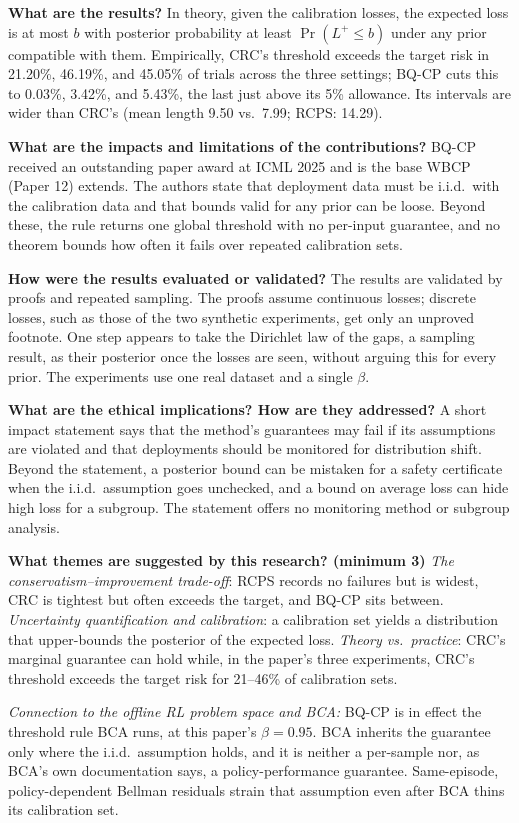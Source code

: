 \documentclass[11pt]{article}
\newcommand{\q}[2]{\item \textbf{#1} #2}
\newcommand{\tiein}[1]{\par\smallskip\noindent\emph{Connection to the offline RL problem space and BCA:} #1\par\medskip}
\begin{document}
\begin{qna}
\q{What are the results?}
In theory, given the calibration losses, the expected loss is at most $b$ with posterior probability at least $\Pr(L^+ \le b)$ under any prior compatible with them. Empirically, CRC's threshold exceeds the target risk in 21.20\%, 46.19\%, and 45.05\% of trials across the three settings; BQ-CP cuts this to 0.03\%, 3.42\%, and 5.43\%, the last just above its 5\% allowance. Its intervals are wider than CRC's (mean length 9.50 vs.\ 7.99; RCPS: 14.29).

\q{What are the impacts and limitations of the contributions?}
BQ-CP received an outstanding paper award at ICML 2025 and is the base WBCP (Paper 12) extends. The authors state that deployment data must be i.i.d.\ with the calibration data and that bounds valid for any prior can be loose. Beyond these, the rule returns one global threshold with no per-input guarantee, and no theorem bounds how often it fails over repeated calibration sets.

\q{How were the results evaluated or validated?}
The results are validated by proofs and repeated sampling. The proofs assume continuous losses; discrete losses, such as those of the two synthetic experiments, get only an unproved footnote. One step appears to take the Dirichlet law of the gaps, a sampling result, as their posterior once the losses are seen, without arguing this for every prior. The experiments use one real dataset and a single $\beta$.

\q{What are the ethical implications? How are they addressed?}
A short impact statement says that the method's guarantees may fail if its assumptions are violated and that deployments should be monitored for distribution shift. Beyond the statement, a posterior bound can be mistaken for a safety certificate when the i.i.d.\ assumption goes unchecked, and a bound on average loss can hide high loss for a subgroup. The statement offers no monitoring method or subgroup analysis.

\q{What themes are suggested by this research? (minimum 3)}
\emph{The conservatism--improvement trade-off}: RCPS records no failures but is widest, CRC is tightest but often exceeds the target, and BQ-CP sits between. \emph{Uncertainty quantification and calibration}: a calibration set yields a distribution that upper-bounds the posterior of the expected loss. \emph{Theory vs.\ practice}: CRC's marginal guarantee can hold while, in the paper's three experiments, CRC's threshold exceeds the target risk for 21--46\% of calibration sets.

\end{qna}
\tiein{BQ-CP is in effect the threshold rule BCA runs, at this paper's $\beta = 0.95$. BCA inherits the guarantee only where the i.i.d.\ assumption holds, and it is neither a per-sample nor, as BCA's own documentation says, a policy-performance guarantee. Same-episode, policy-dependent Bellman residuals strain that assumption even after BCA thins its calibration set.}
\end{document}
